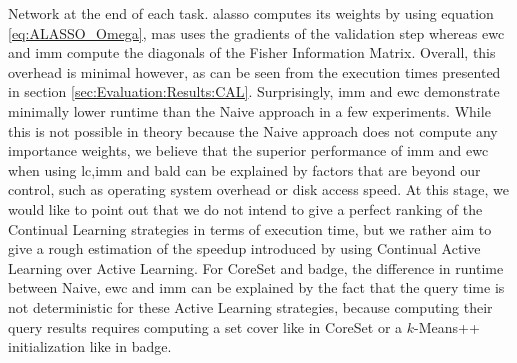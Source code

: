Network at the end of each task. \gls{alasso} computes its weights by using equation \ref{eq:ALASSO_Omega}, \gls{mas} uses the gradients of the validation step whereas
\gls{ewc} and \gls{imm} compute the diagonals of the Fisher Information Matrix. Overall, this overhead is minimal however, as can be seen from the execution times presented
in section \ref{sec:Evaluation:Results:CAL}. Surprisingly, \gls{imm} and \gls{ewc} demonstrate minimally lower runtime than the Naive approach in a few experiments. While
this is not possible in theory because the Naive approach does not compute any importance weights, we believe that the superior performance of \gls{imm} and \gls{ewc} when
using \gls{lc},\gls{imm} and \gls{bald} can be explained by factors that are beyond our control, such as operating system overhead or disk access speed. At this stage,
we would like to point out that we do not intend to give a perfect ranking of the Continual Learning strategies in terms of execution time, but we rather aim to
give a rough estimation of the speedup introduced by using Continual Active Learning over Active Learning. For CoreSet and \gls{badge}, the difference in runtime
between Naive, \gls{ewc} and \gls{imm} can be explained by the fact that the query time is not deterministic for these Active Learning strategies, because computing their
query results requires computing a set cover like in CoreSet or a $k$-Means++ initialization like in \gls{badge}. \par



